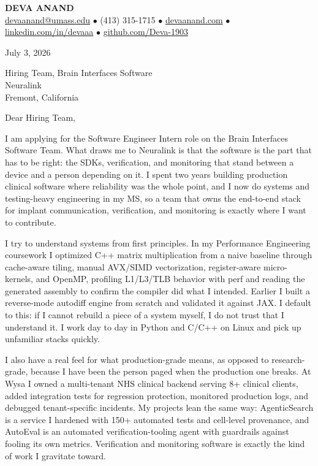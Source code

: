 \documentclass[letterpaper,11pt]{article}
\begin{document}
\begin{center}
    {\fontsize{18}{20}\selectfont\bfseries DEVA ANAND}\\ \vspace{3pt}
    {\small
    \href{mailto:devaanand@umass.edu}{devaanand@umass.edu}
    \enspace$\bullet$\enspace
    (413) 315-1715
    \enspace$\bullet$\enspace
    \href{https://devaanand.com}{devaanand.com}
    \enspace$\bullet$\enspace
    \href{https://linkedin.com/in/devaaa/}{linkedin.com/in/devaaa}
    \enspace$\bullet$\enspace
    \href{https://github.com/Deva-1903}{github.com/Deva-1903}}
\end{center}

\vspace{6pt}

July 3, 2026

Hiring Team, Brain Interfaces Software \\
Neuralink \\
Fremont, California

\vspace{2pt}

Dear Hiring Team,

I am applying for the Software Engineer Intern role on the Brain Interfaces Software Team. What draws me to Neuralink is that the software is the part that has to be right: the SDKs, verification, and monitoring that stand between a device and a person depending on it. I spent two years building production clinical software where reliability was the whole point, and I now do systems and testing-heavy engineering in my MS, so a team that owns the end-to-end stack for implant communication, verification, and monitoring is exactly where I want to contribute.

I try to understand systems from first principles. In my Performance Engineering coursework I optimized C++ matrix multiplication from a naive baseline through cache-aware tiling, manual AVX/SIMD vectorization, register-aware micro-kernels, and OpenMP, profiling L1/L3/TLB behavior with perf and reading the generated assembly to confirm the compiler did what I intended. Earlier I built a reverse-mode autodiff engine from scratch and validated it against JAX. I default to this: if I cannot rebuild a piece of a system myself, I do not trust that I understand it. I work day to day in Python and C/C++ on Linux and pick up unfamiliar stacks quickly.

I also have a real feel for what production-grade means, as opposed to research-grade, because I have been the person paged when the production one breaks. At Wysa I owned a multi-tenant NHS clinical backend serving 8+ clinical clients, added integration tests for regression protection, monitored production logs, and debugged tenant-specific incidents. My projects lean the same way: AgenticSearch is a service I hardened with 150+ automated tests and cell-level provenance, and AutoEval is an automated verification-tooling agent with guardrails against fooling its own metrics. Verification and monitoring software is exactly the kind of work I gravitate toward.
\end{document}
